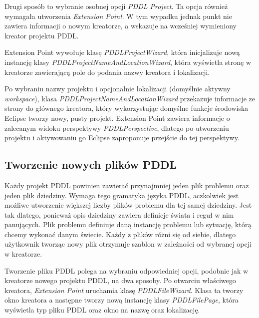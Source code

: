 Drugi sposób to wybranie osobnej opcji \emph{PDDL Project}. Ta opcja również wymagała utworzenia \emph{Extension Point}. W tym wypadku jednak punkt nie zawiera informacji o nowym kreatorze, a wskazuje na wcześniej wymieniony kreator projektu PDDL.

Extension Point wywołuje klasę \emph{PDDLProjectWizard}, która inicjalizuje nową instancję klasy \emph{PDDLProjectNameAndLocationWizard}, która wyświetla stronę w kreatorze zawierającą pole do podania nazwy kreatora i lokalizacji. 

Po wybraniu nazwy projektu i opcjonalnie lokalizacji (domyślnie aktywny \emph{workspace}), klasa \emph{PDDLProjectNameAndLocationWizard} przekazuje informacje ze strony do głównego kreatora, który wykorzystując domyślne funkcje środowiska Eclipse tworzy nowy, pusty projekt. Extension Point zawiera informacje o zalecanym widoku perspektywy \emph{PDDLPerspective}, dlatego po utworzeniu projektu i aktywowaniu go Eclipse zaproponuje przejście do tej perspektywy.


\subsection{Tworzenie nowych plików PDDL}
Każdy projekt PDDL powinien zawierać przynajmniej jeden plik problemu oraz jeden plik dziedziny. Wymaga tego gramatyka języka PDDL, aczkolwiek jest możliwe utworzenie większej liczby plików problemu dla tej samej dziedziny. Jest tak dlatego, ponieważ opis dziedziny zawiera definicje świata i reguł w nim panujących. Plik problemu definiuje daną instancję problemu lub sytuację, którą chcemy wykonać danym świecie. Każdy z plików różni się od siebie, dlatego użytkownik tworząc nowy plik otrzymuje szablon w zależności od wybranej opcji w kreatorze. 

Tworzenie pliku PDDL polega na wybraniu odpowiedniej opcji, podobnie jak w kreatorze nowego projektu PDDL, na dwa sposoby. Po otwarciu właściwego kreatora, \emph{Extension Point} uruchamia klasę \emph{PDDLFileWizard}. Klasa ta tworzy okno kreatora a następne tworzy nową instancję klasy \emph{PDDLFilePage}, która wyświetla typ pliku PDDL oraz okno na nazwę oraz lokalizację.

